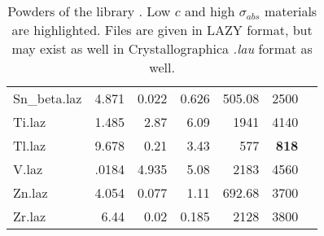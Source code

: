 \begin{table}
\begin{center}
{\begin{small}
\begin{tabular}{|l|rrr|rr|p{}|}
Sn\_beta.laz        & 4.871     & 0.022    &0.626     &505.08    &2500&\\
Ti.laz             & 1.485     & 2.87     &6.09      &1941      &4140&\\
Tl.laz             & 9.678     & 0.21     &3.43      &577       &\textbf{818}&\\
V.laz              & .0184     & 4.935    &5.08      &2183      &4560&\\
Zn.laz             & 4.054     & 0.077    &1.11      &692.68    &3700&\\
Zr.laz             & 6.44      & 0.02     &0.185     &2128      &3800&\\
      \hline
    \end{tabular}\end{small}
    \caption{Powders of the \MCS library \cite{icsd_ill,ILLblue}. Low $c$ and high $\sigma_{abs}$ materials are highlighted. Files are given in LAZY format, but may exist as well in Crystallographica \textit{.lau} format as well.}
    \label{t:powders-data}
    }
  \end{center}
\end{table}

